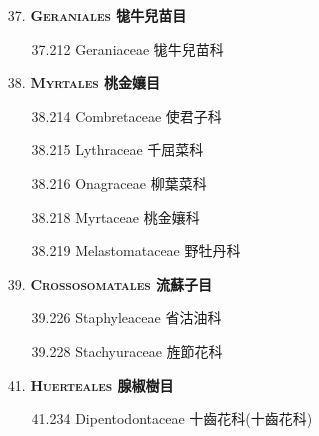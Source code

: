 \begin{enumerate}
  \item[37. ] \textbf{\textsc{Geraniales} 牻牛兒苗目}   
    \begin{enumerate}
      \item[37.212] Geraniaceae 牻牛兒苗科     
        
    \end{enumerate}
  \item[38. ] \textbf{\textsc{Myrtales} 桃金孃目}   
    \begin{enumerate}
      \item[38.214] Combretaceae 使君子科     
        
      \item[38.215] Lythraceae 千屈菜科     
        
      \item[38.216] Onagraceae 柳葉菜科     
        
      \item[38.218] Myrtaceae 桃金孃科     
        
      \item[38.219] Melastomataceae 野牡丹科     
        
    \end{enumerate}
  \item[39. ] \textbf{\textsc{Crossosomatales} 流蘇子目}   
    \begin{enumerate}
      \item[39.226] Staphyleaceae 省沽油科     
        
      \item[39.228] Stachyuraceae 旌節花科     
        
    \end{enumerate}
  \item[41. ] \textbf{\textsc{Huerteales} 腺椒樹目}   
    \begin{enumerate}
      \item[41.234] Dipentodontaceae 十齒花科(十齒花科)     
        
    \end{enumerate}

\end{enumerate}
